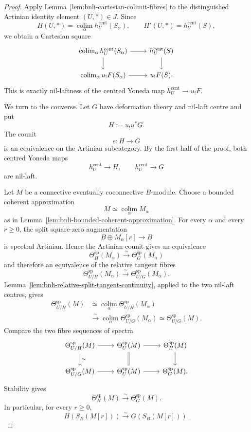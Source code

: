 \begin{proof}
Apply Lemma~\ref{lem:bnli-cartesian-colimit-fibres} to the distinguished
Artinian identity element $(U,*)\in J$.  Since
\[
    H(U,*)=
    \operatorname*{colim}_\alpha h_U^{\mathrm{cent}}(S_\alpha),
    \qquad
    H'(U,*)=h_U^{\mathrm{cent}}(S),
\]
we obtain a Cartesian square
\[
\begin{tikzcd}
\operatorname*{colim}_\alpha h_U^{\mathrm{cent}}(S_\alpha)
    \arrow[r] \arrow[d] &
h_U^{\mathrm{cent}}(S) \arrow[d]\\
\operatorname*{colim}_\alpha u_!F(S_\alpha)
    \arrow[r] &
u_!F(S).
\end{tikzcd}
\]
This is exactly nil-laftness of the centred Yoneda map
$h_U^{\mathrm{cent}}\to u_!F$.

We turn to the converse.  Let $G$ have deformation theory and nil-laft
centre and put
\[
    H:=u_!u^*G.
\]
The counit
\[
    e:H\longrightarrow G
\]
is an equivalence on the Artinian subcategory.  By the first half of the
proof, both centred Yoneda maps
\[
    h_U^{\mathrm{cent}}\longrightarrow H,
    \qquad
    h_U^{\mathrm{cent}}\longrightarrow G
\]
are nil-laft.

Let $M$ be a connective eventually coconnective $B$-module.  Choose a
bounded coherent approximation
\[
    M\simeq\operatorname*{colim}_\alpha M_\alpha
\]
as in Lemma~\ref{lem:bnli-bounded-coherent-approximation}.  For every
$\alpha$ and every $r\geq0$, the split square-zero augmentation
\[
    B\oplus M_\alpha[r]\longrightarrow B
\]
is spectral Artinian.  Hence the Artinian counit gives an equivalence
\[
    \Theta_H^{\mathrm{sp}}(M_\alpha)
    \xrightarrow{\sim}
    \Theta_G^{\mathrm{sp}}(M_\alpha)
\]
and therefore an equivalence of the relative tangent fibres
\[
    \Theta_{U/H}^{\mathrm{sp}}(M_\alpha)
    \xrightarrow{\sim}
    \Theta_{U/G}^{\mathrm{sp}}(M_\alpha).
\]
Lemma~\ref{lem:bnli-relative-split-tangent-continuity}, applied to the two
nil-laft centres, gives
\[
\begin{aligned}
    \Theta_{U/H}^{\mathrm{sp}}(M)
    &\simeq
    \operatorname*{colim}_\alpha
    \Theta_{U/H}^{\mathrm{sp}}(M_\alpha)\\
    &\xrightarrow{\sim}
    \operatorname*{colim}_\alpha
    \Theta_{U/G}^{\mathrm{sp}}(M_\alpha)
    \simeq
    \Theta_{U/G}^{\mathrm{sp}}(M).
\end{aligned}
\]
Compare the two fibre sequences of spectra
\[
\begin{tikzcd}
\Theta_{U/H}^{\mathrm{sp}}(M)
    \arrow[r] \arrow[d,"\sim"] &
\Theta_U^{\mathrm{sp}}(M)
    \arrow[r] \arrow[d,equal] &
\Theta_H^{\mathrm{sp}}(M)
    \arrow[d]\\
\Theta_{U/G}^{\mathrm{sp}}(M)
    \arrow[r] &
\Theta_U^{\mathrm{sp}}(M)
    \arrow[r] &
\Theta_G^{\mathrm{sp}}(M).
\end{tikzcd}
\]
Stability gives
\[
\boxed{
    \Theta_H^{\mathrm{sp}}(M)
    \xrightarrow{\sim}
    \Theta_G^{\mathrm{sp}}(M).}
\]
In particular, for every $r\geq0$,
\[
\boxed{
    H(S_B(M[r]))
    \xrightarrow{\sim}
    G(S_B(M[r])).}
\]


\end{proof}
